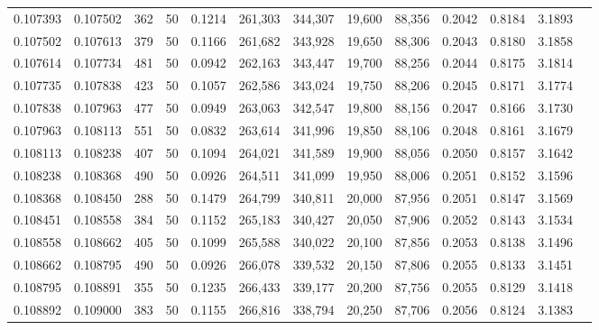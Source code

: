 \begin{tabular}{rrrrrrrrrrrrr}
0.107393 & 0.107502 &   362 &  50 &                                     0.1214 & 261,303 & 344,307 &  19,600 &  88,356 & 0.2042 & 0.8184 & 3.1893 \\
0.107502 & 0.107613 &   379 &  50 &                                     0.1166 & 261,682 & 343,928 &  19,650 &  88,306 & 0.2043 & 0.8180 & 3.1858 \\
0.107614 & 0.107734 &   481 &  50 &                                     0.0942 & 262,163 & 343,447 &  19,700 &  88,256 & 0.2044 & 0.8175 & 3.1814 \\
0.107735 & 0.107838 &   423 &  50 &                                     0.1057 & 262,586 & 343,024 &  19,750 &  88,206 & 0.2045 & 0.8171 & 3.1774 \\
0.107838 & 0.107963 &   477 &  50 &                                     0.0949 & 263,063 & 342,547 &  19,800 &  88,156 & 0.2047 & 0.8166 & 3.1730 \\
0.107963 & 0.108113 &   551 &  50 &                                     0.0832 & 263,614 & 341,996 &  19,850 &  88,106 & 0.2048 & 0.8161 & 3.1679 \\
0.108113 & 0.108238 &   407 &  50 &                                     0.1094 & 264,021 & 341,589 &  19,900 &  88,056 & 0.2050 & 0.8157 & 3.1642 \\
0.108238 & 0.108368 &   490 &  50 &                                     0.0926 & 264,511 & 341,099 &  19,950 &  88,006 & 0.2051 & 0.8152 & 3.1596 \\
0.108368 & 0.108450 &   288 &  50 &                                     0.1479 & 264,799 & 340,811 &  20,000 &  87,956 & 0.2051 & 0.8147 & 3.1569 \\
0.108451 & 0.108558 &   384 &  50 &                                     0.1152 & 265,183 & 340,427 &  20,050 &  87,906 & 0.2052 & 0.8143 & 3.1534 \\
0.108558 & 0.108662 &   405 &  50 &                                     0.1099 & 265,588 & 340,022 &  20,100 &  87,856 & 0.2053 & 0.8138 & 3.1496 \\
0.108662 & 0.108795 &   490 &  50 &                                     0.0926 & 266,078 & 339,532 &  20,150 &  87,806 & 0.2055 & 0.8133 & 3.1451 \\
0.108795 & 0.108891 &   355 &  50 &                                     0.1235 & 266,433 & 339,177 &  20,200 &  87,756 & 0.2055 & 0.8129 & 3.1418 \\
0.108892 & 0.109000 &   383 &  50 &                                     0.1155 & 266,816 & 338,794 &  20,250 &  87,706 & 0.2056 & 0.8124 & 3.1383 \\

\end{tabular}
